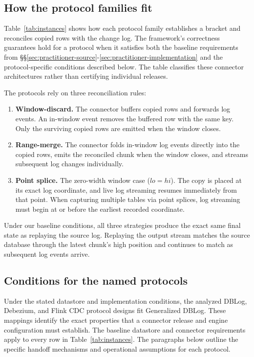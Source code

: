 \documentclass[sigconf,nonacm,10pt]{acmart}
\theoremstyle{plain}
\theoremstyle{definition}
\begin{document}
\subsection{How the protocol families fit}
\label{sec:practitioner-table}

Table~\ref{tab:instances} shows how each protocol family establishes a 
bracket and reconciles copied rows with the change log. The framework's 
correctness guarantees hold for a protocol when it satisfies both the baseline 
requirements from \S\S\ref{sec:practitioner-source}-\ref{sec:practitioner-implementation} 
and the protocol-specific conditions described below. The table classifies 
these connector architectures rather than certifying individual releases.

The protocols rely on three reconciliation rules:
\begin{enumerate}
\item \textbf{Window-discard.} The connector buffers copied rows and
forwards log events. An in-window event removes the buffered row with the
same key. Only the surviving copied rows are emitted when the window closes.
\item \textbf{Range-merge.} The connector folds in-window log events directly 
into the copied rows, emits the reconciled chunk when the window closes, and streams 
subsequent log changes individually.
\item \textbf{Point splice.} The zero-width window case ($lo = hi$). The copy is 
placed at its exact log coordinate, and live log streaming resumes immediately from 
that point. When capturing multiple tables via point splices, log streaming must begin 
at or before the earliest recorded coordinate.
\end{enumerate}

Under our baseline conditions, all three strategies produce the exact same final 
state as replaying the source log. Replaying the output stream matches the source 
database through the latest chunk's high position and continues to match as 
subsequent log events arrive.

\subsection{Conditions for the named protocols}

Under the stated datastore and implementation conditions, the analyzed DBLog,
Debezium, and Flink CDC protocol designs fit Generalized DBLog. These
mappings identify the exact properties that a connector release and engine
configuration must establish. The baseline
datastore and connector requirements apply to every row in Table~\ref{tab:instances}. 
The paragraphs below outline the specific handoff mechanisms and operational 
assumptions for each protocol.
\end{document}
